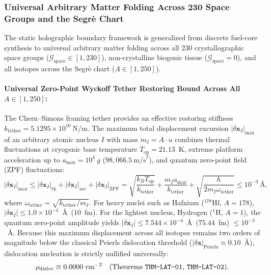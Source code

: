 \documentclass[11pt,onecolumn]{article}
\begin{document}
\subsubsection{Universal Arbitrary Matter Folding Across 230 Space Groups and the Segr\`e Chart}
\label{subsubsec:universal_matter_folding_derivations}
The static holographic boundary framework is generalized from discrete fuel-core synthesis to universal arbitrary matter folding across all 230 crystallographic space groups ($\mathcal{G}_{\text{space}} \in [1, 230]$), non-crystalline biogenic tissue ($\mathcal{G}_{\text{space}} = 0$), and all isotopes across the Segr\`e chart ($A \in [1, 250]$).

\paragraph{Universal Zero-Point Wyckoff Tether Restoring Bound Across All $A \in [1, 250]$:}
The Chern--Simons framing tether provides an effective restoring stiffness $k_{\text{tether}} = 5.1295 \times 10^{10}~\text{N/m}$. The maximum total displacement excursion $|\delta\mathbf{x}_I|_{\max}$ of an arbitrary atomic nucleus $I$ with mass $m_I = A \cdot u$ combines thermal fluctuations at cryogenic base temperature $T_{\text{op}} = 21.13$~K, extreme platform acceleration up to $a_{\max} = 10^4~g$ ($98{,}066.5~\text{m/s}^2$), and quantum zero-point field (ZPF) fluctuations:
\begin{equation}
|\delta\mathbf{x}_I|_{\max} \le |\delta\mathbf{x}_I|_{\text{th}} + |\delta\mathbf{x}_I|_{\text{acc}} + |\delta\mathbf{x}_I|_{\text{ZPF}} = \sqrt{\frac{k_B T_{\text{op}}}{k_{\text{tether}}}} + \frac{m_I a_{\max}}{k_{\text{tether}}} + \sqrt{\frac{\hbar}{2 m_I \omega_{\text{tether}}}} \le 10^{-3}~\text{\AA},
\label{eq:universal_tether_bound_deriv}
\end{equation}
where $\omega_{\text{tether}} = \sqrt{k_{\text{tether}}/m_I}$. For heavy nuclei such as Hafnium ($^{178}\text{Hf}$, $A=178$), $|\delta\mathbf{x}_I| \le 1.0\times 10^{-4}$~\AA\ ($10$~fm). For the lightest nucleus, Hydrogen ($^{1}\text{H}$, $A=1$), the quantum zero-point amplitude yields $|\delta\mathbf{x}_I| \le 7.544\times 10^{-4}$~\AA\ ($75.44$~fm) $\le 10^{-3}$~\AA. Because this maximum displacement across all isotopes remains two orders of magnitude below the classical Peierls dislocation threshold ($|\delta\mathbf{x}|_{\text{Peierls}} \approx 0.10$~\AA), dislocation nucleation is strictly nullified universally:
\begin{equation}
\rho_{\text{disloc}} \equiv 0.0000~\text{cm}^{-2} \quad (\text{Theorems \texttt{THM-LAT-01}, \texttt{THM-LAT-02}}).
\end{equation}
\end{document}
